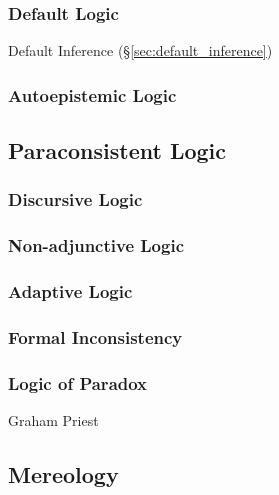 \subsubsection{Default Logic}\label{sec:default_logic}

Default Inference (\S\ref{sec:default_inference})



\subsubsection{Autoepistemic Logic}\label{sec:autoepistemic_logic}



\subsection{Paraconsistent Logic}\label{sec:paraconsistent_logic}

\subsubsection{Discursive Logic}\label{sec:discursive_logic}

\subsubsection{Non-adjunctive Logic}\label{sec:nonadjunctive_logic}

\subsubsection{Adaptive Logic}\label{sec:adaptive_logic}

\subsubsection{Formal Inconsistency}\label{sec:formal_inconsistency}

\subsubsection{Logic of Paradox}\label{sec:logic_of_paradox}

Graham Priest



\subsection{Mereology}\label{sec:mereology}

